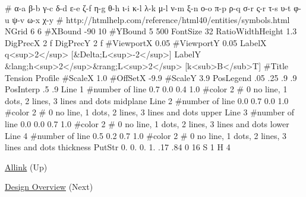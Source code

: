\begin{DoxyCode}
# α-a β-b γ-c δ-d ε-e ζ-f η-g θ-h ι-i κ-l λ-k μ-l ν-m ξ-n ο-o π-p ρ-q σ-r ς-r
       τ-s υ-t φ-u ψ-v ω-x χ-y  
# http://htmlhelp.com/reference/html40/entities/symbols.html
NGrid
6 6
#XBound
-90 10
#YBound
5 500
FontSize
32
RatioWidthHeight
1.3
DigPrecX
2 f
DigPrecY
2 f
#ViewportX
0.05
#ViewportY
0.05
LabelX
q<sup>2</sup> [&Delta;L<sup>-2</sup>]
LabelY
&lang;h<sup>2</sup>&rang;L<sup>2</sup> [k<sub>B</sub>T]
#Title
Tension Profile
#ScaleX
1.0     
#OffSetX
-9.9
#ScaleY
3.9
PosLegend
.05 .25 .9 .9
PosInterp
.5 .9 
Line
1 #number of line
0.7 0.0 0.4 1.0 #color
2 # 0 no line, 1 dots, 2 lines, 3 lines and dots
midplane
Line
2 #number of line
0.0 0.7 0.0 1.0 #color
2 # 0 no line, 1 dots, 2 lines, 3 lines and dots
upper 
Line
3 #number of line
0.0 0.0 0.7 1.0 #color
2 # 0 no line, 1 dots, 2 lines, 3 lines and dots
lower
Line
4 #number of line
0.5 0.2 0.7 1.0 #color
2 # 0 no line, 1 dots, 2 lines, 3 lines and dots
thickness
PutStr
0. 0. 0. 1.
.17 .84 0 16
S 1 H 4
\end{DoxyCode}



\begin{DoxyItemize}
\item \hyperlink{index}{\-Allink} (\-Up)  
\item \hyperlink{design_page}{\-Design \-Overview} (\-Next)  
\end{DoxyItemize}